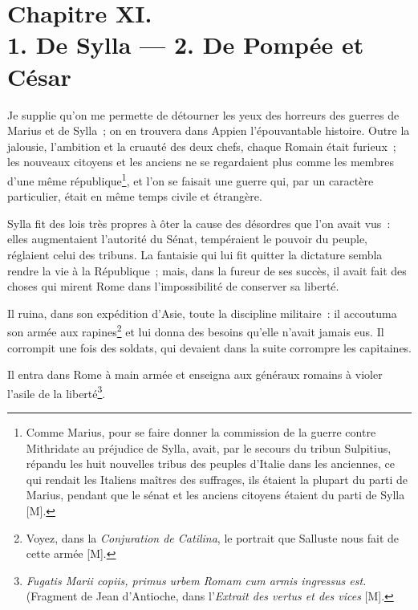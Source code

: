 \documentclass[french,twoside]{book} %
\newcommand\chapteropen{} %
\newcommand\chaptercont{} %
\begin{document}
\chapteropen
\chapter[{Chapitre XI. 1. De Sylla — 2. De Pompée et César}]{Chapitre XI. \\
1. De Sylla — 2. De Pompée et César}
\label{considérations\_Romains\_chap\_11}\renewcommand{\leftmark}{Chapitre XI. \\
1. De Sylla — 2. De Pompée et César}


\chaptercont
\noindent Je supplie qu’on me permette de détourner les yeux des horreurs des guerres de Marius et de Sylla ; on en trouvera dans Appien l’épouvantable histoire. Outre la jalousie, l’ambition et la cruauté des deux chefs, chaque Romain était furieux ; les nouveaux citoyens et les anciens ne se regardaient plus comme les membres d’une même république\footnote{Comme Marius, pour se faire donner la commission de la guerre contre Mithridate au préjudice de Sylla, avait, par le secours du tribun Sulpitius, répandu les huit nouvelles tribus des peuples d’Italie dans les anciennes, ce qui rendait les Italiens maîtres des suffrages, ils étaient la plupart du parti de Marius, pendant que le sénat et les anciens citoyens étaient du parti de Sylla [M].}, et l’on se faisait une guerre qui, par un caractère particulier, était en même temps civile et étrangère.\par
Sylla fit des lois très propres à ôter la cause des désordres que l’on avait vus : elles augmentaient l’autorité du Sénat, tempéraient le pouvoir du peuple, réglaient celui des tribuns. La fantaisie qui lui fit quitter la dictature sembla rendre la vie à la République ; mais, dans la fureur de ses succès, il avait fait des choses qui mirent Rome dans l’impossibilité de conserver sa liberté.\par
Il ruina, dans son expédition d’Asie, toute la discipline militaire : il accoutuma son armée aux rapines\footnote{Voyez, dans la {\itshape Conjuration de Catilina}, le portrait que Salluste nous fait de cette armée [M].} et lui donna des besoins qu’elle n’avait jamais eus. Il corrompit une fois des soldats, qui devaient dans la suite corrompre les capitaines.\par
Il entra dans Rome à main armée et enseigna aux généraux romains à violer l’asile de la liberté\footnote{{\itshape Fugatis Marii copiis, primus urbem Romam cum armis ingressus est.} (Fragment de Jean d’Antioche, dans l’{\itshape Extrait des vertus et des vices} [M].}.\par
\end{document}
